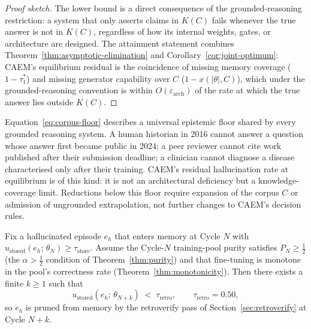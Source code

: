 \begin{proof}[Proof sketch]
The lower bound is a direct consequence of the grounded-reasoning restriction: a system that only asserts claims in $K(C)$ fails whenever the true answer is not in $K(C)$, regardless of how its internal weights, gates, or architecture are designed. The attainment statement combines Theorem~\ref{thm:asymptotic-elimination} and Corollary~\ref{cor:joint-optimum}: CAEM's equilibrium residual is the coincidence of missing memory coverage ($1 - \tau_{1}^{*}$) and missing generator capability over $C$ ($1 - x(|\theta|, C)$), which under the grounded-reasoning convention is within $O(\varepsilon_{\text{arch}})$ of the rate at which the true answer lies outside $K(C)$.
\end{proof}

Equation~\ref{eq:corpus-floor} describes a universal epistemic floor shared by every grounded reasoning system. A human historian in 2016 cannot answer a question whose answer first became public in 2024; a peer reviewer cannot cite work published after their submission deadline; a clinician cannot diagnose a disease characterised only after their training. CAEM's residual hallucination rate at equilibrium is of this kind: it is not an architectural deficiency but a knowledge-coverage limit. Reductions below this floor require expansion of the corpus $C$ or admission of ungrounded extrapolation, not further changes to CAEM's decision rules.

\begin{corollary}
\label{cor:self-correction}
Fix a hallucinated episode $e_{h}$ that enters memory at Cycle $N$ with $u_{\text{stored}}(e_{h};\, \theta_{N}) \geq \tau_{\text{store}}$. Assume the Cycle-$N$ training-pool purity satisfies $P_{N} \geq \tfrac{1}{2}$ (the $\alpha > \tfrac{1}{2}$ condition of Theorem~\ref{thm:purity}) and that fine-tuning is monotone in the pool's correctness rate (Theorem~\ref{thm:monotonicity}). Then there exists a finite $k \geq 1$ such that
\begin{equation}
u_{\text{stored}}(e_{h};\, \theta_{N+k}) \;<\; \tau_{\text{retro}}, \qquad \tau_{\text{retro}} = 0.50,
\label{eq:self-correction}
\end{equation}
so $e_{h}$ is pruned from memory by the retroverify pass of Section~\ref{sec:retroverify} at Cycle $N + k$.
\end{corollary}

